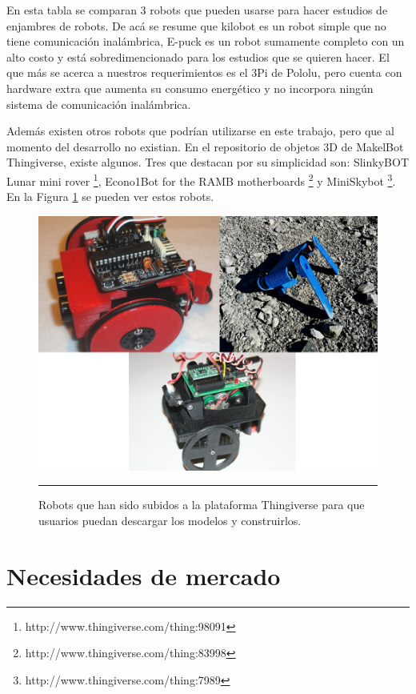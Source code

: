 En esta tabla se comparan 3 robots que pueden usarse para hacer estudios de enjambres de robots. De acá se resume que kilobot es un robot simple que no tiene comunicación inalámbrica, E-puck es un robot sumamente completo con un alto costo y está sobredimencionado para los estudios que se quieren hacer. El que más se acerca a nuestros requerimientos es el 3Pi de Pololu, pero cuenta con hardware extra que aumenta su consumo energético y no incorpora ningún sistema de comunicación inalámbrica.

\FloatBarrier
Además existen otros robots que podrían utilizarse en este trabajo, pero que al momento del desarrollo no existian. En el repositorio de objetos 3D de MakelBot Thingiverse, existe algunos. Tres que destacan por su simplicidad son: SlinkyBOT Lunar mini rover \footnote{http://www.thingiverse.com/thing:98091}, Econo1Bot for the RAMB motherboards \footnote{http://www.thingiverse.com/thing:83998} y MiniSkybot \footnote{http://www.thingiverse.com/thing:7989}. En la Figura \ref{fig:thingiverse} se pueden ver estos robots.
 
\begin{figure}[htbp]
	\centering
		\includegraphics[width=1\textwidth]{./Figures/thingiverse.png}
		\rule{35em}{0.5pt}
	\caption[Robots en Thingiverse]{Robots que han sido subidos a la plataforma Thingiverse para que usuarios puedan descargar los modelos y construirlos.}
	\label{fig:thingiverse}
\end{figure}

\section{Necesidades de mercado}

